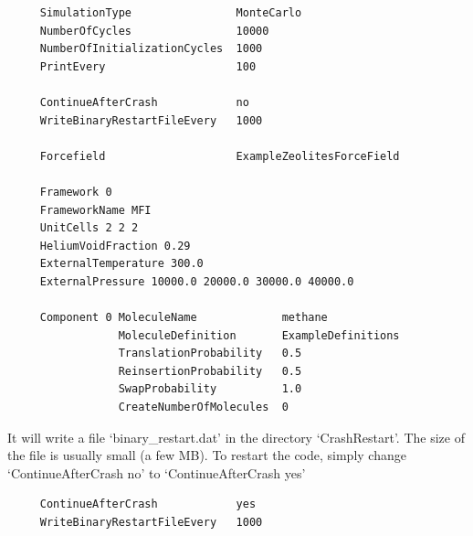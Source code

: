 \begin{tiny}
\begin{verbatim}
     SimulationType                MonteCarlo
     NumberOfCycles                10000
     NumberOfInitializationCycles  1000
     PrintEvery                    100

     ContinueAfterCrash            no
     WriteBinaryRestartFileEvery   1000

     Forcefield                    ExampleZeolitesForceField

     Framework 0
     FrameworkName MFI
     UnitCells 2 2 2
     HeliumVoidFraction 0.29
     ExternalTemperature 300.0
     ExternalPressure 10000.0 20000.0 30000.0 40000.0

     Component 0 MoleculeName             methane
                 MoleculeDefinition       ExampleDefinitions
                 TranslationProbability   0.5
                 ReinsertionProbability   0.5
                 SwapProbability          1.0
                 CreateNumberOfMolecules  0
\end{verbatim}
\end{tiny}
It will write a file `binary\_restart.dat' in the directory `CrashRestart'. The size of the file is usually small (a few MB).
To restart the code, simply change `ContinueAfterCrash no' to `ContinueAfterCrash yes'
\begin{tiny}
\begin{verbatim}
     ContinueAfterCrash            yes
     WriteBinaryRestartFileEvery   1000
\end{verbatim}
\end{tiny}

\newpage



